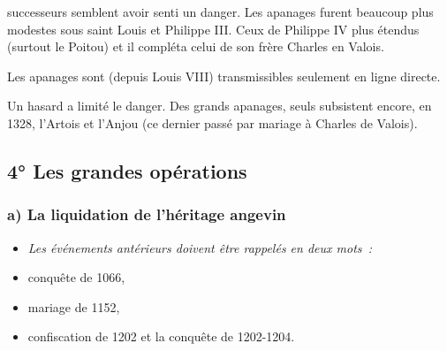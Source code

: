 \documentclass[french,twoside]{book} %
\newlength{\listmod}
\newcommand{\listhead}[1]{\hspace{-1\listmod}\emph{#1}}
\begin{document}
\label{p22} successeurs semblent avoir senti un danger. Les apanages furent beaucoup plus modestes sous saint Louis et Philippe III. Ceux de Philippe IV plus étendus (surtout le Poitou) et il compléta celui de son frère Charles en Valois.\par
Les apanages sont (depuis Louis VIII) transmissibles seulement en ligne directe.\par
Un hasard a limité le danger. Des grands apanages, seuls subsistent encore, en 1328, l’Artois et l’Anjou (ce dernier passé par mariage à Charles de Valois).
\subsection[{4° Les grandes opérations}]{4° Les grandes opérations}
\label{c03c4}
\subsubsection[{a) La liquidation de l’héritage angevin}]{a) La liquidation de l’héritage angevin}

\begin{itemize}[itemsep=0pt,]
\item[]\listhead{Les événements antérieurs doivent être rappelés en deux mots :}
\item conquête de 1066,
\item mariage de 1152,
\item confiscation de 1202 et la conquête de 1202-1204.
\end{itemize}
\end{document}
